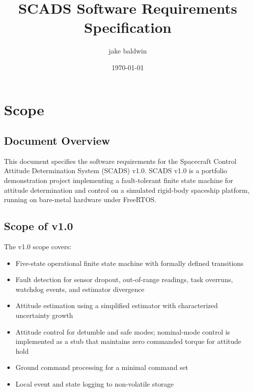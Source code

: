 \documentclass{article}
\title{SCADS Software Requirements Specification}
\author{jake baldwin}
\date{\today}
\begin{document}
    \maketitle

    \section{Scope}\label{sec:scope}

        \subsection{Document Overview}
            This document specifies the software requirements for the Spacecraft Control 
            Attitude Determination System (SCADS) v1.0. SCADS v1.0 is a portfolio 
            demonstration project implementing a fault-tolerant finite state machine 
            for attitude determination and control on a simulated rigid-body 
            spaceship platform, running on bare-metal hardware under FreeRTOS.
        \subsection{Scope of v1.0}
            The v1.0 scope covers:
            \begin{itemize}
                \item Five-state operational finite state machine with formally 
                        defined transitions
                \item Fault detection for sensor dropout, out-of-range readings,
                        task overruns, watchdog events, and estimator divergence
                \item Attitude estimation using a simplified estimator with 
                        characterized uncertainty growth
                \item Attitude control for detumble and safe modes; nominal-mode 
                        control is implemented as a stub that maintains zero
                        commanded torque for attitude hold
                \item Ground command processing for a minimal command set
                \item Local event and state logging to non-volatile storage
            \end{itemize}
\end{document}
